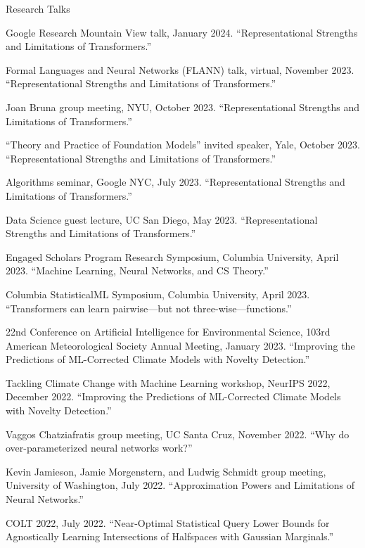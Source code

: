 \documentclass{cv} %
\begin{document}
\begin{rSection}{Research Talks}
\begin{rSubsection}{}{}{}

\item Google Research Mountain View talk, January 2024. ``Representational Strengths and Limitations of Transformers.''
\item Formal Languages and Neural Networks (FLANN) talk, virtual, November 2023. ``Representational Strengths and Limitations of Transformers.''
\item Joan Bruna group meeting, NYU, October 2023. ``Representational Strengths and Limitations of Transformers.''
\item ``Theory and Practice of Foundation Models'' invited speaker, Yale, October 2023. ``Representational Strengths and Limitations of Transformers.''
\item Algorithms seminar, Google NYC, July 2023. ``Representational Strengths and Limitations of Transformers.''
\item Data Science guest lecture, UC San Diego, May 2023. ``Representational Strengths and Limitations of Transformers.''
\item Engaged Scholars Program Research Symposium, Columbia University, April 2023. ``Machine Learning, Neural Networks, and CS Theory.''
\item Columbia StatisticalML Symposium, Columbia University, April 2023. ``Transformers can learn pairwise---but not three-wise---functions.''
\item 22nd Conference on Artificial Intelligence for Environmental Science, 103rd American Meteorological Society Annual Meeting, January 2023. ``Improving the Predictions of ML-Corrected Climate Models with Novelty Detection.''
\item Tackling Climate Change with Machine Learning workshop, NeurIPS 2022, December 2022. ``Improving the Predictions of ML-Corrected Climate Models with Novelty Detection.''
\item Vaggos Chatziafratis group meeting, UC Santa Cruz, November 2022. ``Why do over-parameterized neural networks work?''
\item Kevin Jamieson, Jamie Morgenstern, and Ludwig Schmidt group meeting, University of Washington, July 2022. ``Approximation Powers and Limitations of Neural Networks.''
\item COLT 2022, July 2022.  ``Near-Optimal Statistical Query Lower Bounds for Agnostically Learning Intersections of Halfspaces with Gaussian Marginals.''

\end{rSubsection}
\end{rSection}
\end{document}
